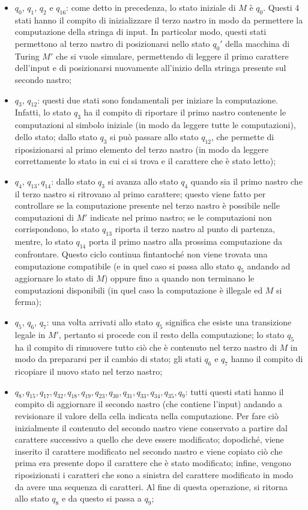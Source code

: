 \documentclass[a4paper,12pt,titlepage,oneside]{book}
\begin{document}
\begin{itemize}
	\item $q_0$, $q_1$, $q_2$ e $q_{16}$: come detto in precedenza, lo stato iniziale di $M$ è $q_0$. Questi 4 stati hanno il compito di inizializzare il terzo nastro in modo da permettere la computazione della stringa di input. In particolar modo, questi stati permettono al terzo nastro di posizionarsi nello stato $q_0'$ della macchina di Turing $M'$ che si vuole simulare, permettendo di leggere il primo carattere dell'input e di posizionarsi nuovamente all'inizio della stringa presente sul secondo nastro;
	\item $q_3$, $q_{12}$: questi due stati sono fondamentali per iniziare la computazione. Infatti, lo stato $q_3$ ha il compito di riportare il primo nastro contenente le computazioni al simbolo iniziale (in modo da leggere tutte le computazioni), dello stato; dallo stato $q_3$ si può passare allo stato $q_{12}$, che permette di riposizionarsi al primo elemento del terzo nastro (in modo da leggere correttamente lo stato in cui ci si trova e il carattere che è stato letto);
	\item $q_4$, $q_{13}, q_{14}$: dallo stato $q_3$ si avanza allo stato $q_4$ quando sia il primo nastro che il terzo nastro si ritrovano al primo carattere; questo viene fatto per controllare se la computazione presente nel terzo nastro è possibile nelle computazioni di $M'$ indicate nel primo nastro; se le computazioni non corrispondono, lo stato $q_{13}$ riporta il terzo nastro al punto di partenza, mentre, lo stato $q_{14}$ porta il primo nastro alla prossima computazione da confrontare. Questo ciclo continua fintantoché non viene trovata una computazione compatibile (e in quel caso si passa allo stato $q_5$ andando ad aggiornare lo stato di $M$) oppure fino a quando non terminano le computazioni disponibili (in quel caso la computazione è illegale ed $M$ si ferma);
	\item $q_5$, $q_6$, $q_7$: una volta arrivati allo stato $q_5$ significa che esiste una transizione legale in $M'$, pertanto si procede con il resto della computazione; lo stato $q_5$ ha il compito di rimuovere tutto ciò che è contenuto nel terzo nastro di $M$ in modo da prepararsi per il cambio di stato; gli stati $q_6$ e $q_7$ hanno il compito di ricopiare il nuovo stato nel terzo nastro;
	\item $q_8, q_{15}, q_{17}, q_{32}, q_{18}, q_{19}, q_{23}, q_{30}, q_{31}, q_{33}, q_{34}, q_{35}, q_9$: tutti questi stati hanno il compito di aggiornare il secondo nastro (che contiene l'input) andando a revisionare il valore della cella indicata nella computazione. Per fare ciò inizialmente il contenuto del secondo nastro viene conservato a partire dal carattere successivo a quello che deve essere modificato; dopodiché, viene inserito il carattere modificato nel secondo nastro e viene copiato ciò che prima era presente dopo il carattere che è stato modificato; infine, vengono riposizionati i caratteri che sono a sinistra del carattere modificato in modo da avere una sequenza di caratteri. Al fine di questa operazione, si ritorna allo stato $q_8$ e da questo si passa a $q_9$;

\end{itemize}
\end{document}
